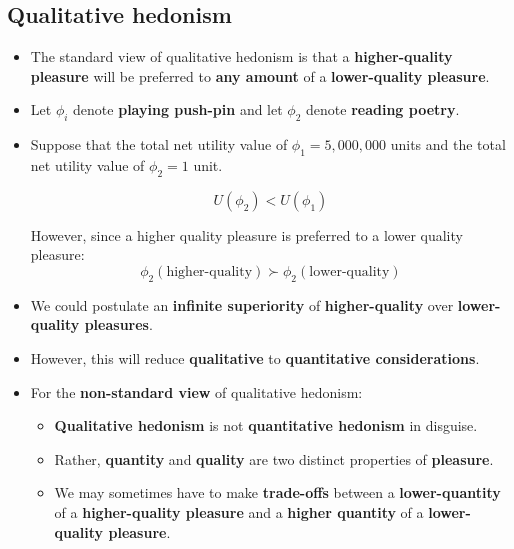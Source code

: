 \documentclass[11pt]{article}
\begin{document}
\subsection{Qualitative hedonism}
\label{sec:orge23636a}
\begin{itemize}
\item The standard view of qualitative hedonism is that a \textbf{higher-quality pleasure} will be preferred to \textbf{any amount} of a \textbf{lower-quality pleasure}.
\item Let \(\phi_i\) denote \textbf{playing push-pin} and let \(\phi_2\) denote \textbf{reading poetry}.
\item Suppose that the total net utility value of \(\phi_1 = 5,000,000\) units and the total net utility value of \(\phi_2 = 1\) unit.

\[U(\phi_2) < U(\phi_1)\]

However, since a higher quality pleasure is preferred to a lower quality pleasure:
\[\phi_2 (\text{higher-quality}) \succ \phi_2 (\text{lower-quality})\]

\item We could postulate an \textbf{infinite superiority} of \textbf{higher-quality} over \textbf{lower-quality pleasures}.
\item However, this will reduce \textbf{qualitative} to \textbf{quantitative considerations}.
\item For the \textbf{non-standard view} of qualitative hedonism:
\begin{itemize}
\item \textbf{Qualitative hedonism} is not \textbf{quantitative hedonism} in disguise.
\item Rather, \textbf{quantity} and \textbf{quality} are two distinct properties of \textbf{pleasure}.
\item We may sometimes have to make \textbf{trade-offs} between a \textbf{lower-quantity} of a \textbf{higher-quality pleasure} and a \textbf{higher quantity} of a \textbf{lower-quality pleasure}.
\end{itemize}
\end{itemize}
\end{document}
